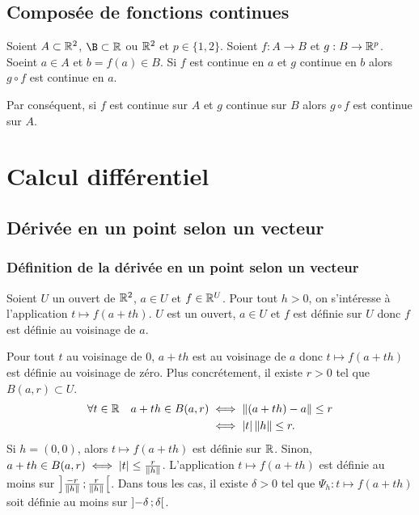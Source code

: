 \subsection{Composée de fonctions continues}

\begin{theo}
  Soient $A \subset \mathbb{R}^2$, $\B\subset \R$ ou $\mathbb{R}^2$ et $p \in \{1, 2\}$. Soient $f : A \rightarrow B$ et $g: B \rightarrow \mathbb{R}^p$. Soeint $a \in A$ et $b=f(a) \in B$. Si $f$ est continue en $a$ et $g$ continue en $b$ alors $g \circ f$ est continue en $a$.

Par conséquent, si $f$ est continue sur $A$ et $g$ continue sur $B$ alors $g \circ f$ est continue sur $A$.
\end{theo}

\section{Calcul différentiel}

\subsection{Dérivée en un point selon un vecteur}

\subsubsection{Définition de la dérivée en un point selon un vecteur}

Soient $U$ un ouvert de $\mathbb{R}^2$, $a \in U$ et $f \in \mathbb{R}^U$. Pour tout $h>0$, on s'intéresse à l'application $t \longmapsto f(a+th)$. $U$ est un ouvert, $a \in U$ et $f$ est définie sur $U$ donc $f$ est définie au voisinage de $a$.

Pour tout $t$ au voisinage de $0$, $a+th$ est au voisinage de $a$ donc $t \longmapsto f(a+th)$ est définie au voisinage de zéro. Plus concrétement, il existe $r>0$ tel que $B(a, r) \subset U$.
\begin{align}
  \forall t \in \mathbb{R} \quad a+th \in B(a, r) &\iff \left\lVert(a+th)-a\right\rVert \leq r \\
  &\iff \left\lvert t\right\rvert \left\lVert h\right\rVert \leq r.
\end{align}
Si $h=(0, 0)$, alors $t \longmapsto f(a+th)$ est définie sur $\mathbb{R}$. Sinon, $a+th \in B(a, r) \iff \left\lvert t\right\rvert \leq \frac{r}{\left\lVert h\right\rVert}$. L'application $t \longmapsto f(a+th)$ est définie au moins sur $\left] \frac{-r}{\left\lVert h\right\rVert} \, ;  \frac{r}{\left\lVert h\right\rVert} \right[$. Dans tous les cas, il existe $\delta>0$ tel que $\Psi_h : t \longmapsto f(a+th)$ soit définie au moins sur $\left] -\delta \, ;  \delta \right[$. 

